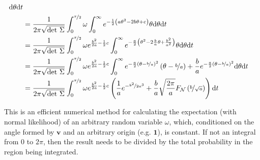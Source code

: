 \documentclass{article}
\begin{document}
\begin{equation*}
\begin{aligned}
    \text{d}\theta
    \text{d}t
    \\
    &=
    \frac{1}{2\pi \sqrt{\text{det }\Sigma}}
    \int_0^{\nicefrac{\pi}{2}}
    \omega
    \int_0^\infty
    e^{
      -\frac{1}{2}\left(a \theta^2
      - 2b \theta
      +c\right)
    }
    \theta
    \text{d}\theta
    \text{d}t
    \\
    &=
    \frac{1}{2\pi \sqrt{\text{det }\Sigma}}
    \int_0^{\nicefrac{\pi}{2}}
    \omega
    e^{\frac{b^2}{2a}-\frac{1}{2}c}
    \int_0^\infty
    e^{
      -\frac{a}{2}\left(\theta^2
      - 2\frac{b}{a} \theta
      + \frac{b^2}{a^2}\right)
    }
    \theta
    \text{d}\theta
    \text{d}t
    \\
    &=
    \frac{1}{2\pi \sqrt{\text{det }\Sigma}}
    \int_0^{\nicefrac{\pi}{2}}
    \omega
    e^{\frac{b^2}{2a}-\frac{1}{2}c}
    \int_0^\infty
    e^{-\frac{a}{2}(\theta-\nicefrac{b}{a})^2}
    \left(\theta - \nicefrac{b}{a}\right)
    +
    \frac{b}{a} e^{-\frac{a}{2}(\theta-\nicefrac{b}{a})^2}
    \text{d}\theta
    \text{d}t
    \\
    &=
    \frac{1}{2\pi \sqrt{\text{det }\Sigma}}
    \int_0^{\nicefrac{\pi}{2}}
    \omega
    e^{\frac{b^2}{2a}-\frac{1}{2}c}
    \left(
      \frac{1}{a}
      e^{-\nicefrac{b^2}{2a^3}}
      +
      \frac{b}{a}
      \sqrt{
      \frac{2\pi}{a}
      }
      F_{\mathcal{N}}\left(\nicefrac{b}{\sqrt{a}}\right)
    \right)
    \text{d}t
  \end{aligned}
\end{equation*}

This is an efficient numerical method for calculating the expectation (with
normal likelihood) of an arbitrary random variable $\omega$, which, conditioned
on the angle formed by $\mathbf{v}$ and an arbitrary origin (e.g. $\mathbf{1}$),
is constant. If not an integral from $0$ to $2\pi$, then the result needs to be
divided by the total probability in the region being integrated.
\end{document}

